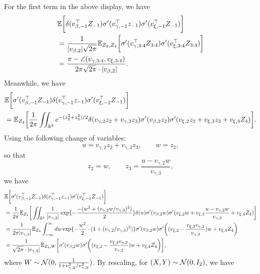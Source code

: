 For the first term in the above display, we have
\begin{align*}
	& {\mathbb{E}} \bigg[\delta(v_{\beta, -1}^\top Z_{-1})  \sigma'(v_{\gamma, -1}^\top z_{-1}) \sigma'(v_{\xi, -1}^\top Z_{-1})\bigg] \\
	& = \frac{1}{|v_{\beta, 2}|\sqrt{2\pi}} {\mathbb{E}}_{Z_3, Z_4}  \bigg[\sigma'(v_{\gamma, 3:4}^\top Z_{3:4}) \sigma'(v_{\xi, 3:4}^\top Z_{3:4})\bigg] \\
	& = \frac{\pi - \angle(v_{\gamma, 3:4}, v_{\xi, 3:4})}{2\pi\sqrt{2\pi} \cdot |v_{\beta, 2}|}.
\end{align*}
Meanwhile, we have
\begin{align*}
	& {\mathbb{E}} \bigg[\sigma'(v_{\beta, -1}^\top Z_{-1})  \delta(v_{\gamma, -1}^\top z_{-1}) \sigma'(v_{\xi, -1}^\top Z_{-1})\bigg] \\
	& = {\mathbb{E}}_{Z_4} \bigg[ \frac{1}{2\pi}\iint_{{\mathbb{R}}^2} e^{-(z_2^2+z_3^2)/2} \delta(v_{\gamma, 2}z_2 + v_{\gamma, 3}z_3) \sigma'(v_{\beta, 2}z_2)\sigma'(v_{\xi, 2}z_2 + v_{\xi, 3}z_3 + v_{\xi, 4} Z_4)\bigg].
\end{align*}
Using the following change of variables:
\[
	u = v_{\gamma, 2} z_2 + v_{\gamma, 3} z_3, \qquad w = z_2,
\]
so that
\[
	z_2 = w, \qquad z_3 = \frac{u - v_{\gamma, 2}w}{v_{\gamma, 3}},
\]
we have
\begin{align*}
	& {\mathbb{E}} \bigg[\sigma'(v_{\beta, -1}^\top Z_{-1})  \delta(v_{\gamma, -1}^\top z_{-1}) \sigma'(v_{\xi, -1}^\top Z_{-1})\bigg] \\
	& = \frac{1}{2\pi}{\mathbb{E}}_{Z_4} \bigg[ \iint_{{\mathbb{R}}^2} \frac{1}{|v_{\gamma, 3}|} \exp\{-\frac{-(w^2 + (v_{\gamma, 2} w/ v_{\gamma, 3})^2)}{2}\} \delta(u) \sigma'(v_{\beta, 2} w) \sigma'(v_{\xi, 2}w + v_{\xi, 3}\frac{u-v_{\gamma, 2}w}{v_{\gamma, 3}} + v_{\xi, 4}Z_4)\bigg] \\
	&  = \frac{1}{2\pi|v_{\gamma, 3}|} {\mathbb{E}}_{Z_4} \int_{-\infty}^{\infty} dw \exp\{-\frac{w^2}{2}\cdot (1+ (v_{\gamma, 2}/v_{\gamma, 3})^2)\} \sigma'(v_{\beta, 2} w) \sigma'\bigg((v_{\xi, 2} - \frac{v_{\xi, 3}v_{\gamma, 2}}{v_{\gamma, 3}}) w + v_{\xi, 4} Z_4\bigg) \\
	& = \frac{1}{\sqrt{2\pi}\cdot |v_{\gamma, 3}|}{\mathbb{E}}_{Z_4, W} \bigg[\sigma'(v_{\beta, 2} w)\sigma'\bigg((v_{\xi, 2} - \frac{v_{\xi, 3}v_{\gamma, 2}}{v_{\gamma, 3}}) w + v_{\xi, 4} Z_4\bigg)\bigg],
\end{align*}
where $W\sim{\mathcal{N}}(0, \frac{1}{1 + v_{\gamma,2}^2/v_{\gamma, 3}^2})$. By rescaling, for $(X, Y)\sim{\mathcal{N}}(0, I_2)$, we have
